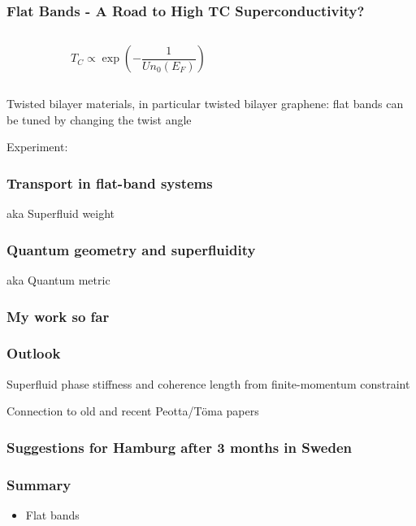 \documentclass[aspectratio=169]{beamer}
\begin{document}
\begin{frame}
	\frametitle{Flat Bands - A Road to High TC Superconductivity?}
	
	\begin{columns}
		\begin{column}{0.4\textwidth}
			\begin{equation}
				T_C \propto \exp{(- \frac{1}{U n_0 (E_F)})}
			\end{equation}
			\end{column}
			\begin{column}{0.6\textwidth}
			\end{column}
	\end{columns}
\end{frame}

\begin{frame}	
	Twisted bilayer materials, in particular twisted bilayer graphene: flat bands can be tuned by changing the twist angle
	
	Experiment: \cite{caoUnconventionalSuperconductivityMagicangle2018}
\end{frame}

\begin{frame}
	\frametitle{Transport in flat-band systems}
	
	aka Superfluid weight
\end{frame}

\begin{frame}
	\frametitle{Quantum geometry and superfluidity}
	
	aka Quantum metric
\end{frame}

\begin{frame}
	\frametitle{My work so far}
\end{frame}
	
\begin{frame}
	\frametitle{Outlook}
	
	Superfluid phase stiffness and coherence length from finite-momentum constraint
	
	Connection to old and recent Peotta/Töma papers
\end{frame}


\begin{frame}
	\frametitle{Suggestions for Hamburg after 3 months in Sweden}
\end{frame}


\begin{frame}
	\frametitle{Summary}
	
	\begin{itemize}
		\item Flat bands
	\end{itemize}

\end{frame}
\end{document}

